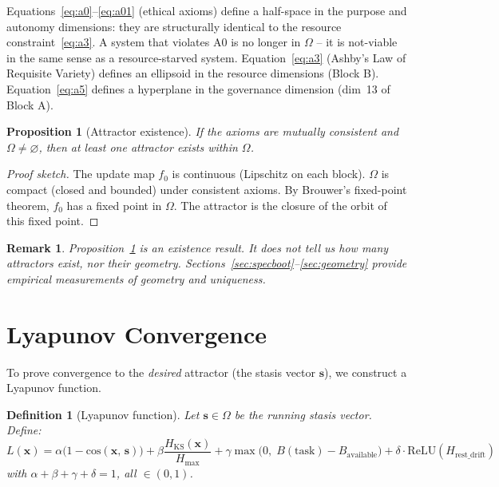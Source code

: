 \documentclass[11pt, a4paper]{article}
\newtheorem{proposition}[theorem]{Proposition}
\newtheorem{definition}{Definition}
\newtheorem{remark}{Remark}
\newcommand{\stasis}{\bm{s}}
\newcommand{\sv}{\bm{x}}
\newcommand{\cosim}[2]{\mathrm{cos}\!\left(#1,\, #2\right)}
\begin{document}
Equations~\eqref{eq:a0}--\eqref{eq:a01} (ethical axioms) define
a half-space in the purpose and autonomy dimensions:
they are structurally identical to the resource constraint~\eqref{eq:a3}.
A system that violates A0 is no longer in $\Omega$ -- it is not-viable
in the same sense as a resource-starved system.
Equation~\eqref{eq:a3} (Ashby's Law of Requisite Variety) defines an
ellipsoid in the resource dimensions (Block B).
Equation~\eqref{eq:a5} defines a hyperplane in the governance dimension
(dim~13 of Block A).

\begin{proposition}[Attractor existence]
\label{prop:existence}
If the axioms are mutually consistent and $\Omega \neq \varnothing$,
then at least one attractor exists within $\Omega$.
\end{proposition}

\begin{proof}[Proof sketch]
The update map $f_0$ is continuous (Lipschitz on each block).
$\Omega$ is compact (closed and bounded) under consistent axioms.
By Brouwer's fixed-point theorem, $f_0$ has a fixed point in $\Omega$.
The attractor is the closure of the orbit of this fixed point.
\end{proof}

\begin{remark}
Proposition~\ref{prop:existence} is an existence result.
It does not tell us how many attractors exist, nor their geometry.
Sections~\ref{sec:specboot}--\ref{sec:geometry} provide empirical
measurements of geometry and uniqueness.
\end{remark}


\section{Lyapunov Convergence}
\label{sec:lyapunov}

To prove convergence to the \emph{desired} attractor (the stasis vector
$\stasis$), we construct a Lyapunov function.

\begin{definition}[Lyapunov function]
\label{def:lyapunov}
Let $\stasis \in \Omega$ be the running stasis vector.
Define:
\begin{equation}
  L(\sv) = \alpha \bigl(1 - \cosim{\sv}{\stasis}\bigr)
          + \beta \frac{H_\text{KS}(\sv)}{H_\text{max}}
          + \gamma \max\!\bigl(0,\; B(\text{task}) - B_\text{available}\bigr)
          + \delta \cdot \mathrm{ReLU}(H_\text{rest\_drift})
\label{eq:lyapunov}
\end{equation}
with $\alpha + \beta + \gamma + \delta = 1$, all $\in (0,1)$.
\end{definition}
\end{document}
